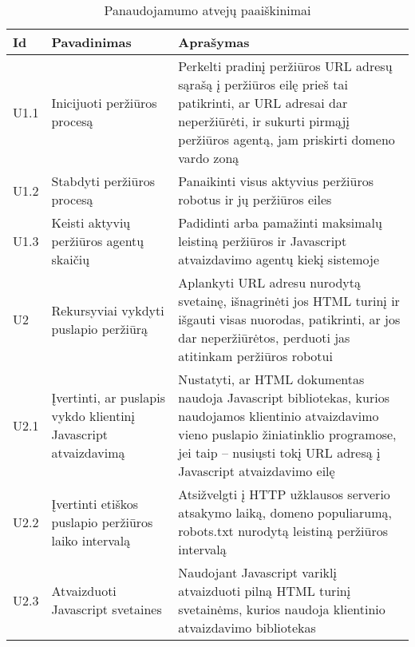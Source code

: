 \begin{table}[ht]
  \centering
  \caption{Panaudojamumo atvejų paaiškinimai}
    \begin{tabular}{|p{2em}|p{13em}|p{20em}|}
    \hline
    \textbf{Id} & \textbf{Pavadinimas} & \textbf{Aprašymas} \bigstrut\\
    \hline
    U1.1 & Inicijuoti peržiūros procesą & Perkelti pradinį peržiūros URL adresų sąrašą į peržiūros eilę prieš tai patikrinti, ar URL adresai dar neperžiūrėti, ir sukurti pirmąjį peržiūros agentą, jam priskirti domeno vardo zoną \\
    \hline
    U1.2 & Stabdyti peržiūros procesą & Panaikinti visus aktyvius peržiūros robotus ir jų peržiūros eiles  \\
    \hline
    U1.3 & Keisti aktyvių peržiūros agentų skaičių & Padidinti arba pamažinti maksimalų leistiną peržiūros ir Javascript atvaizdavimo agentų kiekį sistemoje \\
    \hline
    U2 & Rekursyviai vykdyti puslapio peržiūrą & Aplankyti URL adresu nurodytą svetainę, išnagrinėti jos HTML turinį ir išgauti visas nuorodas, patikrinti, ar jos dar neperžiūrėtos, perduoti jas atitinkam peržiūros robotui  \\
    \hline
    U2.1 & Įvertinti, ar puslapis vykdo klientinį Javascript atvaizdavimą & Nustatyti, ar HTML dokumentas naudoja Javascript bibliotekas, kurios naudojamos klientinio atvaizdavimo vieno puslapio žiniatinklio programose, jei taip -- nusiųsti tokį URL adresą į Javascript atvaizdavimo eilę  \\
    \hline
    U2.2 & Įvertinti etiškos puslapio peržiūros laiko intervalą & Atsižvelgti į HTTP užklausos serverio atsakymo laiką, domeno populiarumą, robots.txt nurodytą leistiną peržiūros intervalą \\
    \hline
    U2.3 & Atvaizduoti Javascript svetaines & Naudojant Javascript variklį atvaizduoti pilną HTML turinį svetainėms, kurios naudoja klientinio atvaizdavimo bibliotekas \\
    \hline
    \end{tabular}%
  \label{tab:use_case_table}%
\end{table}%